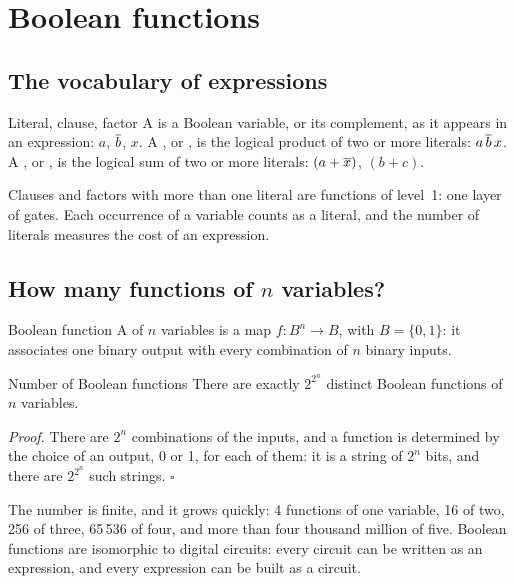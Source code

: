 \section{Boolean functions}

\subsection{The vocabulary of expressions}

\begin{definition}{Literal, clause, factor}
A  is a Boolean variable, or its complement, as it appears in an
expression: $a$, $\overline{b}$, $x$. A , or , is
the logical product of two or more literals: $a\,\overline{b}\,x$. A
, or , is the logical sum of two or more literals:
$(a+\overline{x})$, $(b+c)$.
\end{definition}

Clauses and factors with more than one literal are functions of level~1: one
layer of gates. Each occurrence of a variable counts as a literal, and the
number of literals measures the cost of an expression.

\subsection{How many functions of $n$ variables?}

\begin{definition}{Boolean function}
A  of $n$ variables is a map $f:B^{n}\to B$, with
$B=\{0,1\}$: it associates one binary output with every combination of $n$
binary inputs.
\end{definition}

\begin{theorem}{Number of Boolean functions}
There are exactly $2^{2^{n}}$ distinct Boolean functions of $n$ variables.
\end{theorem}

\noindent\emph{Proof.} There are $2^{n}$ combinations of the inputs, and a
function is determined by the choice of an output, 0 or 1, for each of them:
it is a string of $2^{n}$ bits, and there are $2^{2^{n}}$ such strings.
\hfill$\square$

\smallskip
The number is finite, and it grows quickly: 4 functions of one variable, 16 of
two, 256 of three, 65\,536 of four, and more than four thousand million of
five. Boolean functions are isomorphic to digital circuits: every circuit can
be written as an expression, and every expression can be built as a circuit.

